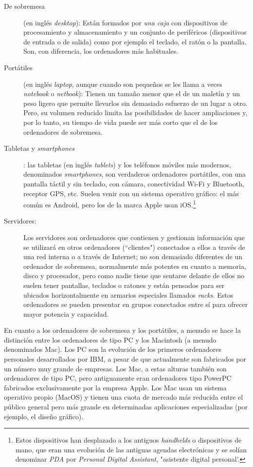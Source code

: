 \begin{description} \item[De sobremesa] (en inglés \emph{desktop}): Están formados por \emph{una caja} con dispositivos de procesamiento y almacenamiento y un conjunto de periféricos (dispositivos de entrada o de salida) como por ejemplo el teclado, el ratón o la pantalla. Son, con diferencia, los ordenadores más habituales. \item[Portátiles] (en inglés \emph{laptop}, aunque cuando son pequeños se les llama a veces \emph{notebook} o \emph{netbook}): Tienen un tamaño menor que el de un maletín y un peso ligero que permite llevarlos sin demasiado esfuerzo de un lugar a otro. Pero, su volumen reducido limita las posibilidades de hacer ampliaciones y, por lo tanto, su tiempo de vida puede ser más corto que el de los ordenadores de sobremesa. 

\item[Tabletas y \emph{smartphones}]: las tabletas (en inglés \emph{tablets}) y los teléfonos móviles más modernos, denominados \emph{smartphones}, son verdaderos ordenadores portátiles, con una pantalla táctil y sin teclado, con cámara, conectividad Wi-Fi y Bluetooth, receptor GPS, etc. Suelen venir con un sistema operativo gráfico: el más común es Android, pero los de la marca Apple usan iOS.\footnote{Estos dispositivos han desplazado a los antiguos \emph{handhelds} o dispositivos de mano, que eran una evolución de las antiguas agendas electrónicas y se solían denominar \emph{PDA} por \emph{Personal Digital Assistant}, "asistente digital personal'.} 

\item[Servidores:] Los servidores son ordenadores que contienen y gestionan información que se utilizará en otros ordenadores (``clientes") conectados a ellos a través de una red interna o a través de Internet; no son demasiado diferentes de un ordenador de sobremesa, normalmente más potentes en cuanto a memoria, disco y procesador, pero como nadie tiene que sentarse delante de ellos no suelen tener pantallas, teclados o ratones y están pensados para ser ubicados horizontalmente en armarios especiales llamados \emph{racks}. Estos ordenadores se pueden presentar en grupos conectados entre sí para ofrecer mayor potencia y capacidad. \end{description} 

En cuanto a los ordenadores de sobremesa y los portátiles, a menudo se hace la distinción entre los ordenadores de tipo PC y los Macintosh (a menudo denominados Mac). Los PC son la evolución de los primeros ordenadores personales desarrollados por IBM, a pesar de que actualmente son fabricados por un número muy grande de empresas. Los Mac, a estas alturas también son ordenadores de tipo PC, pero antiguamente eran ordenadores tipo PowerPC fabricados exclusivamente por la empresa Apple. Los Mac usan un sistema operativo propio (MacOS) y tienen una cuota de mercado más reducida entre el público general pero más grande en determinadas aplicaciones especializadas (por ejemplo, el diseño gráfico). 

